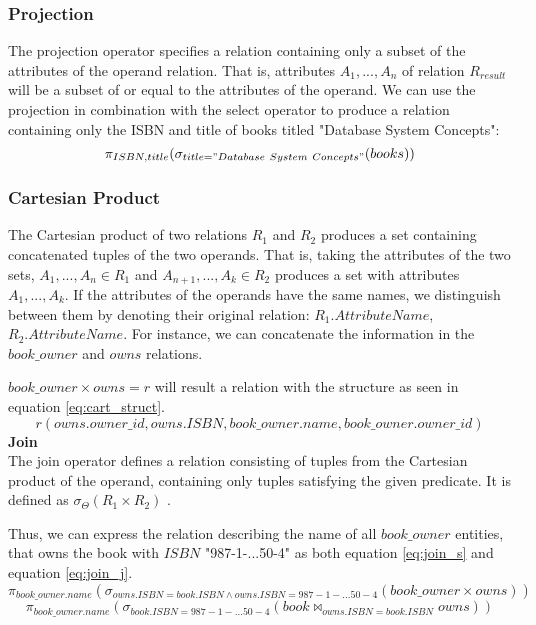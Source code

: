 \subsubsection*{Projection}
The projection operator specifies a relation containing only a subset of the attributes of the operand relation\cite{DBSBook}.
That is, attributes $A_1, ..., A_n$ of relation $R_{result}$ will be a subset of or equal to the attributes of the operand.
We can use the projection in combination with the select operator to produce a relation containing only the ISBN and title of books titled "Database System Concepts":
$$\pi_{ISBN,title} (\sigma_{title = "Database\ System\ Concepts"}(books))$$
\subsubsection*{Cartesian Product}
The Cartesian product of two relations $R_1$ and $R_2$ produces a set containing concatenated tuples of the two operands.
That is, taking the attributes of the two sets, $A_1,...,A_n \in R_1$ and $A_{n+1},...,A_k \in R_2$ produces a set with attributes $A_1,...,A_k$.
If the attributes of the operands have the same names, we distinguish between them by denoting their original relation: $R_1.AttributeName$, $R_2.AttributeName$. \cite{DBSBook}
For instance, we can concatenate the information in the $book\_owner$ and $owns$ relations.

$book\_owner \times owns = r$ will result a relation with the structure as seen in equation \ref{eq:cart_struct}.
\begin{equation}\label{eq:cart_struct}
    r(owns.owner\_id, owns.ISBN,book\_owner.name,book\_owner.owner\_id)
\end{equation}
\textbf{Join}\\
The join operator defines a relation consisting of tuples from the Cartesian product of the operand, containing only tuples satisfying the given predicate.
It is defined as $\sigma_{\Theta} (R_1 \times R_2)$ \cite{DBSBook}.

Thus, we can express the relation describing the name of all $book\_owner$ entities, that owns the book with $ISBN$ "987-1-...50-4" as both equation \ref{eq:join_s} and equation \ref{eq:join_j}.
\begin{equation}\label{eq:join_s}
    \pi_{book\_owner.name} (\sigma_{owns.ISBN = book.ISBN \wedge owns.ISBN = 987-1-...50-4}  (book\_owner \times owns))
\end{equation}
\begin{equation}\label{eq:join_j}
    \pi_{book\_owner.name} (\sigma_{book.ISBN = 987-1-...50-4} (book \Join_{owns.ISBN = book.ISBN} owns))
\end{equation}\\


